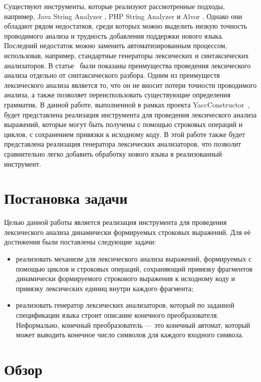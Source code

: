 Существуют инструменты, которые реализуют рассмотренные подходы, например, Java String Analyzer \cite{JSA1}, PHP String Analyzer \cite{PHPSA} и Alvor \cite{Alvor1}. Однако они обладают рядом недостатков, среди которых можно выделить низкую точность проводимого анализа и трудность добавления поддержки нового языка. Последний недостаток можно заменить автоматизированным процессом, использовав, например, стандартные генераторы лексических и синтаксических анализаторов. В статье~\cite{LexerAdv} были показаны преимущества проведения лексического анализа отдельно от синтаксического разбора. Одним из преимуществ лексического анализа является то, что он не вносит потери точности проводимого анализа, а также позволяет переиспользовать существующие определения грамматик. В данной работе, выполненной в рамках проекта YaccConstructor~\cite{YC_article}, будет представлена реализация инструмента для проведения лексического анализа выражений, которые могут быть получены с помощью строковых операций и циклов, с сохранением привязки к исходному коду. В этой работе также будет представлена реализация генератора лексических анализаторов, что позволит сравнительно легко добавить обработку нового языка в реализованный инструмент.


\section{Постановка задачи}
Целью данной работы является реализация инструмента для проведения лексического анализа динамически формируемых строковых выражений. Для её достижения были поставлены следующие задачи:

\begin{itemize}
\item реализовать механизм для лексического анализа выражений, формируемых с помощью циклов и строковых операций, сохраняющий привязку фрагментов динамически формируемого строкового выражения к исходному коду и привязку лексических единиц внутри каждого фрагмента;
\item реализовать генератор лексических анализаторов, который по заданной спецификации языка строит описание конечного преобразователя. Неформально, конечный преобразователь --- это конечный автомат, который может выводить конечное число символов для каждого входного символа.
\end{itemize}


\section{Обзор}

